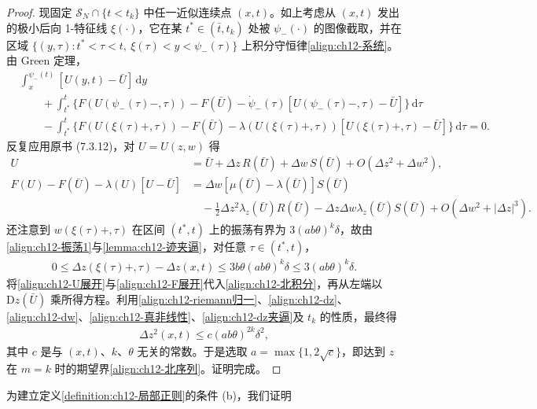\documentclass[../../main.tex]{subfiles}
\begin{document}
\begin{proof}
现固定 $\mathscr{S}_N\cap\{t<t_k\}$ 中任一近似连续点 $(x,t)$。如上考虑从 $(x,t)$ 发出的极小后向 1-特征线 $\xi(\cdot)$，它在某 $t^*\in(\bar t,t_k)$ 处被 $\psi_-(\cdot)$ 的图像截取，并在区域 $\{(y,\tau):t^*<\tau<t,\ \xi(\tau)<y<\psi_-(\tau)\}$ 上积分守恒律\eqref{align:ch12-系统}。由 Green 定理，
\begin{align}
&\int_x^{\psi_-(t)}[U(y,t)-\bar U]\,\mathrm{d}y\nonumber\\
&\qquad+\int_{t^*}^t\{F(U(\psi_-(\tau)-,\tau))-F(\bar U)-\dot\psi_-(\tau)[U(\psi_-(\tau)-,\tau)-\bar U]\}\,\mathrm{d}\tau\nonumber\\
&\qquad-\int_{t^*}^t\{F(U(\xi(\tau)+,\tau))-F(\bar U)-\lambda(U(\xi(\tau)+,\tau))[U(\xi(\tau)+,\tau)-\bar U]\}\,\mathrm{d}\tau=0.
\label{align:ch12-北积分}
\end{align}
反复应用原书 (7.3.12)，对 $U=U(z,w)$ 得
\begin{align}
U&=\bar U+\Delta z\,R(\bar U)+\Delta w\,S(\bar U)+O(\Delta z^2+\Delta w^2),
\label{align:ch12-U展开}\\
F(U)-F(\bar U)-\lambda(U)[U-\bar U]&=\Delta w[\mu(\bar U)-\lambda(\bar U)]S(\bar U)\nonumber\\
&\quad-\frac12\Delta z^2\lambda_z(\bar U)R(\bar U)-\Delta z\Delta w\lambda_z(\bar U)S(\bar U)+O(\Delta w^2+|\Delta z|^3).
\label{align:ch12-F展开}
\end{align}
还注意到 $w(\xi(\tau)+,\tau)$ 在区间 $(t^*,t)$ 上的振荡有界为 $3(ab\theta)^k\delta$，故由\eqref{align:ch12-振荡1}与\cref{lemma:ch12-迹夹逼}，对任意 $\tau\in(t^*,t)$，
\begin{align}
0\leqslant\Delta z(\xi(\tau)+,\tau)-\Delta z(x,t)\leqslant 3b\theta(ab\theta)^k\delta\leqslant 3(ab\theta)^k\delta.
\label{align:ch12-dz夹逼}
\end{align}
将\eqref{align:ch12-U展开}与\eqref{align:ch12-F展开}代入\eqref{align:ch12-北积分}，再从左端以 $\mathrm{D}z(\bar U)$ 乘所得方程。利用\eqref{align:ch12-riemann归一}、\eqref{align:ch12-dz}、\eqref{align:ch12-dw}、\eqref{align:ch12-真非线性}、\eqref{align:ch12-dz夹逼}及 $t_k$ 的性质，最终得
\begin{align}
\Delta z^2(x,t)\leqslant c(ab\theta)^{2k}\delta^2,
\label{align:ch12-dz平方}
\end{align}
其中 $c$ 是与 $(x,t)$、$k$、$\theta$ 无关的常数。于是选取 $a=\max\{1,2\sqrt c\}$，即达到 $z$ 在 $m=k$ 时的期望界\eqref{align:ch12-北序列}。证明完成。
\end{proof}

为建立定义\cref{definition:ch12-局部正则}的条件 (b)，我们证明
\end{document}
